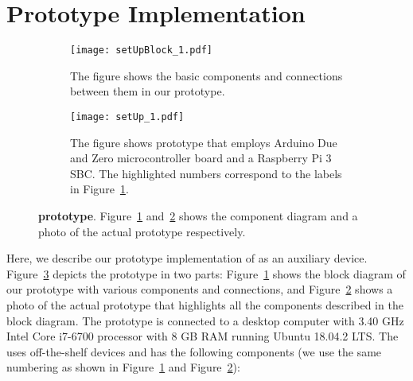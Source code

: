 \section{\name Prototype Implementation}
\label{sec:prototype}


\begin{figure}[t]
    \begin{center}
        \begin{subfigure}{0.4\textwidth}
        \centering
            \texttt{[image: setUpBlock\_1.pdf]}
            \caption{The figure shows the basic components and connections between them in our \name prototype.}
            \label{fig:prototypeArch}    
        \end{subfigure}
    \end{center}
    
    
    \begin{center}
        \begin{subfigure}{0.4\textwidth}
        \centering
        \texttt{[image: setUp\_1.pdf]}
        \caption{The figure shows \name prototype that employs Arduino Due and Zero microcontroller board and a Raspberry Pi 3 SBC. The highlighted numbers correspond to the labels in Figure~\ref{fig:prototypeArch}.}
        \label{fig:prototype}
    \end{subfigure}
    \end{center}
    \vspace{-1em}
    
    \caption{\textbf{\name prototype}. Figure~\ref{fig:prototypeArch} and~\ref{fig:prototype} shows the component diagram and a photo of the actual \name prototype respectively.} 
    \label{fig:prototypeAll}
    \spacesave
\end{figure}

 Here, we describe our prototype implementation of \name as an auxiliary device. Figure~\ref{fig:prototypeAll} depicts the \name prototype in two parts: Figure~\ref{fig:prototypeArch} shows the block diagram of our prototype with various components and connections, and Figure~\ref{fig:prototype} shows a photo of the actual prototype that highlights all the components described in the block diagram. The prototype \device is connected to a desktop computer with 3.40 GHz Intel Core i7-6700 processor with 8 GB RAM running Ubuntu 18.04.2 LTS. The \device uses off-the-shelf devices and has the following components (we use the same numbering as shown in Figure~\ref{fig:prototypeArch} and  Figure~\ref{fig:prototype}):

